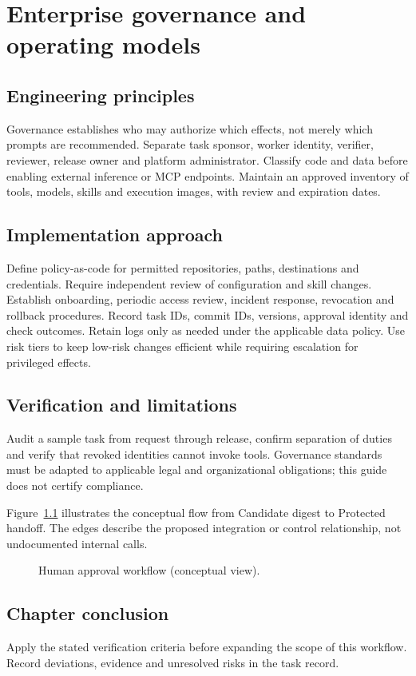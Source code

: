 \chapter{Enterprise governance and operating models}

\section{Engineering principles}

Governance establishes who may authorize which effects, not merely which prompts are recommended. Separate task sponsor, worker identity, verifier, reviewer, release owner and platform administrator. Classify code and data before enabling external inference or MCP endpoints. Maintain an approved inventory of tools, models, skills and execution images, with review and expiration dates.

\section{Implementation approach}

Define policy-as-code for permitted repositories, paths, destinations and credentials. Require independent review of configuration and skill changes. Establish onboarding, periodic access review, incident response, revocation and rollback procedures. Record task IDs, commit IDs, versions, approval identity and check outcomes. Retain logs only as needed under the applicable data policy. Use risk tiers to keep low-risk changes efficient while requiring escalation for privileged effects.

\section{Verification and limitations}

Audit a sample task from request through release, confirm separation of duties and verify that revoked identities cannot invoke tools. Governance standards must be adapted to applicable legal and organizational obligations; this guide does not certify compliance.

Figure~\ref{fig:d21} illustrates the conceptual flow from Candidate digest to Protected handoff. The edges describe the proposed integration or control relationship, not undocumented internal calls.

\begin{figure}[htbp]\centering\caption{Human approval workflow (conceptual view).}\label{fig:d21}\end{figure}

\section{Chapter conclusion}

Apply the stated verification criteria before expanding the scope of this workflow. Record deviations, evidence and unresolved risks in the task record.
